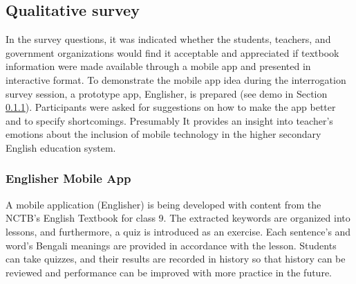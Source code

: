 \documentclass[sn-mathphys,Numbered]{sn-jnl}%
\theoremstyle{thmstyleone}%
\theoremstyle{thmstyletwo}%
\theoremstyle{thmstylethree}%
\begin{document}
\subsection{Qualitative survey}\label{qual_survey} In the survey questions, it was indicated whether the students, teachers, and government organizations would find it acceptable and appreciated if textbook information were made available through a mobile app and presented in interactive format. To demonstrate the mobile app idea during the interrogation survey session, a prototype app, Englisher, is prepared (see demo in Section \ref{Englisher_mobile_app}). Participants were asked for suggestions on how to make the app better and to specify shortcomings. Presumably It provides an insight into teacher’s emotions about the inclusion of mobile technology in the higher secondary English education system.

\subsubsection{Englisher Mobile App}
\label{Englisher_mobile_app}
A mobile application (Englisher) is being developed with content from the NCTB’s English Textbook for class 9. The extracted keywords are organized into lessons, and furthermore, a quiz is introduced as an exercise. Each sentence's and word's Bengali meanings are provided in accordance with the lesson. Students can take quizzes, and their results are recorded in history so that history can be reviewed and performance can be improved with more practice in the future.
\end{document}
